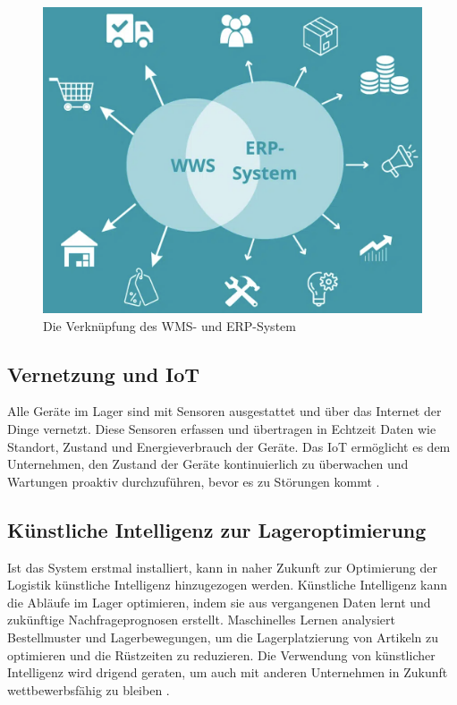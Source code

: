 \begin{figure}[H]
	\centering
	\includegraphics[width=0.8\linewidth]{images/ERP}
	\caption[Die Verknüpfung des WMS- und ERP-System \autocites{modula_2024} .]{Die Verknüpfung des WMS- und ERP-System } 
	\label{fig:EPR}
\end{figure}

\subsection{Vernetzung und IoT}
 Alle Geräte im Lager sind mit Sensoren ausgestattet und über das Internet der Dinge vernetzt. Diese Sensoren erfassen und übertragen in Echtzeit Daten wie Standort, Zustand und Energieverbrauch der Geräte. Das IoT ermöglicht es dem Unternehmen, den Zustand der Geräte kontinuierlich zu überwachen und Wartungen proaktiv durchzuführen, bevor es zu Störungen kommt \autocites{mulder_internet_2024}.

\subsection{Künstliche Intelligenz zur Lageroptimierung}
Ist das System erstmal installiert, kann in naher Zukunft zur Optimierung der Logistik künstliche Intelligenz hinzugezogen werden. Künstliche Intelligenz kann die Abläufe im Lager optimieren, indem sie aus vergangenen Daten lernt und zukünftige Nachfrageprognosen erstellt. Maschinelles Lernen analysiert Bestellmuster und Lagerbewegungen, um die Lagerplatzierung von Artikeln zu optimieren und die Rüstzeiten zu reduzieren. Die Verwendung von künstlicher Intelligenz wird drigend geraten, um auch mit anderen Unternehmen in Zukunft wettbewerbsfähig zu bleiben \autocite{babel_kunstliche_2024}.


